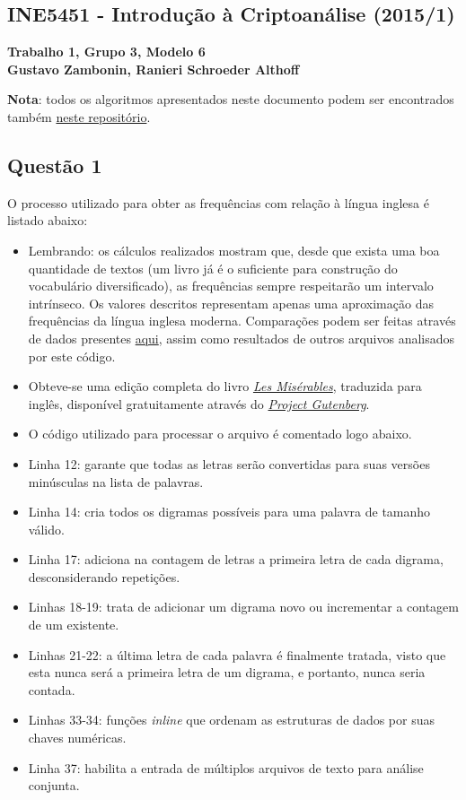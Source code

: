 \documentclass{article}
\begin{document}
\begin{center}
    \section*{INE5451 - Introdução à Criptoanálise (2015/1)}
    \textbf{Trabalho 1, Grupo 3, Modelo 6 \\
    Gustavo Zambonin, Ranieri Schroeder Althoff}
\end{center}

\textbf{Nota}: todos os algoritmos apresentados neste documento podem ser encontrados também \href{https://github.com/zambonin/ufsc-ine5451}{neste repositório}.

\subsection*{Questão 1}
O processo utilizado para obter as frequências com relação à língua inglesa é listado abaixo:
\begin{itemize}
    \item Lembrando: os cálculos realizados mostram que, desde que exista uma boa quantidade de textos (um livro já é o suficiente para construção do vocabulário diversificado), as frequências sempre respeitarão um intervalo intrínseco. Os valores descritos representam apenas uma aproximação das frequências da língua inglesa moderna. Comparações podem ser feitas através de dados presentes \href{http://en.wikipedia.org/wiki/Letter_frequency#Relative_frequencies_of_letters_in_the_English_language}{aqui}, assim como resultados de outros arquivos analisados por este código.
    \item Obteve-se uma edição completa do livro \textit{\href{http://www.gutenberg.org/cache/epub/135/pg135.txt}{Les Misérables}}, traduzida para inglês, disponível gratuitamente através do \textit{\href{http://www.gutenberg.org}{Project Gutenberg}}.
    \item O código utilizado para processar o arquivo é comentado logo abaixo.
    
    \item Linha 12: garante que todas as letras serão convertidas para suas versões minúsculas na lista de palavras.
    \item Linha 14: cria todos os digramas possíveis para uma palavra de tamanho válido.
    \item Linha 17: adiciona na contagem de letras a primeira letra de cada digrama, desconsiderando repetições.
    \item Linhas 18-19: trata de adicionar um digrama novo ou incrementar a contagem de um existente.
    \item Linhas 21-22: a última letra de cada palavra é finalmente tratada, visto que esta nunca será a primeira letra de um digrama, e portanto, nunca seria contada.
    \item Linhas 33-34: funções \textit{inline} que ordenam as estruturas de dados por suas chaves numéricas.
    \item Linha 37: habilita a entrada de múltiplos arquivos de texto para análise conjunta.
\end{itemize}
\end{document}
